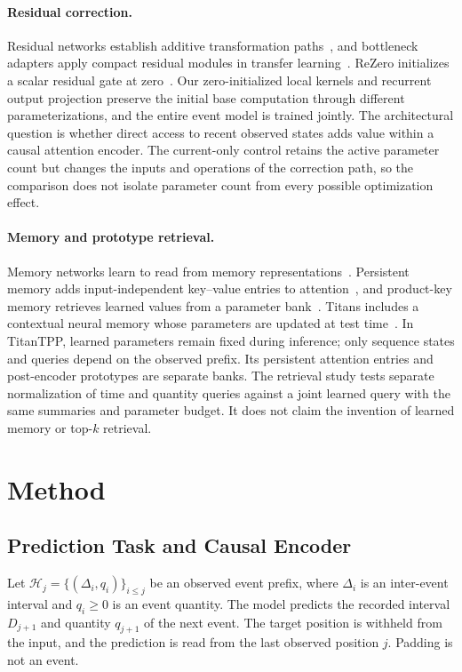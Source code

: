 \documentclass[runningheads]{llncs}
\newcommand{\method}{TitanTPP}
\newcommand{\Hcal}{\mathcal{H}}
\begin{document}
\paragraph{Residual correction.}
Residual networks establish additive transformation paths~\cite{he2016residual}, and bottleneck adapters apply compact residual modules in transfer learning~\cite{houlsby2019adapters}. ReZero initializes a scalar residual gate at zero~\cite{bachlechner2021rezero}. Our zero-initialized local kernels and recurrent output projection preserve the initial base computation through different parameterizations, and the entire event model is trained jointly. The architectural question is whether direct access to recent observed states adds value within a causal attention encoder. The current-only control retains the active parameter count but changes the inputs and operations of the correction path, so the comparison does not isolate parameter count from every possible optimization effect.

\paragraph{Memory and prototype retrieval.}
Memory networks learn to read from memory representations~\cite{sukhbaatar2015memory}. Persistent memory adds input-independent key--value entries to attention~\cite{sukhbaatar2019memory}, and product-key memory retrieves learned values from a parameter bank~\cite{lample2019product}. Titans includes a contextual neural memory whose parameters are updated at test time~\cite{behrouz2025titans}. In \method, learned parameters remain fixed during inference; only sequence states and queries depend on the observed prefix. Its persistent attention entries and post-encoder prototypes are separate banks. The retrieval study tests separate normalization of time and quantity queries against a joint learned query with the same summaries and parameter budget. It does not claim the invention of learned memory or top-$k$ retrieval.

\section{Method}
\subsection{Prediction Task and Causal Encoder}
Let $\Hcal_j=\{(\Delta_i,q_i)\}_{i\leq j}$ be an observed event prefix, where $\Delta_i$ is an inter-event interval and $q_i\geq0$ is an event quantity. The model predicts the recorded interval $D_{j+1}$ and quantity $q_{j+1}$ of the next event. The target position is withheld from the input, and the prediction is read from the last observed position $j$. Padding is not an event.
\end{document}
